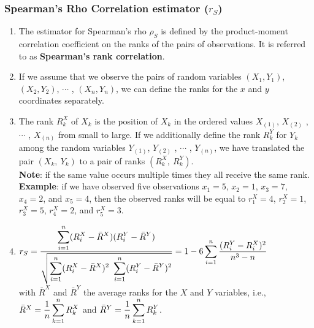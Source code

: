 \subsubsection{Spearman’s Rho Correlation estimator ($r_S$)}

\begin{enumerate}
    \item The estimator for Spearman’s rho $\rho_S$ is defined by the product-moment correlation coefficient on the ranks of the pairs of observations.
    It is referred to as \textbf{Spearman’s rank correlation}.
    \hfill \cite{statistics/book/Statistics-for-Data-Scientists/Maurits-Kaptein}

    \item If we assume that we observe the pairs of random variables $(X_1, Y_1)$, $(X_2, Y_2)$, $\cdots$ , $(X_n , Y_n )$, we can define the ranks for the $x$ and $y$ coordinates separately.
    \hfill \cite{statistics/book/Statistics-for-Data-Scientists/Maurits-Kaptein}

    \item The rank $R^X_k$ of $X_k$ is the position of $X_k$ in the ordered values $X_{(1)}$, $X_{(2)}$ , $\cdots$ , $X_{(n)}$ from small to large.
    If we additionally define the rank $R^Y_k$ for $Y_k$ among the random variables $Y_{(1)}$, $Y_{(2)}$ , $\cdots$ , $Y_{(n)}$, we have translated the pair $(X_k ,\ Y_k )$ to a pair of ranks $(R^X_k ,\ R^Y_k )$.
    \hfill \cite{statistics/book/Statistics-for-Data-Scientists/Maurits-Kaptein}
    \\
    \textbf{Note}: if the same value occurs multiple times they all receive the same rank.
    \hfill \cite{statistics/book/Statistics-for-Data-Scientists/Maurits-Kaptein}
    \\
    \textbf{Example}: if we have observed five observations $x_1 = 5$, $x_2 = 1$, $x_3 = 7$, $x_4 = 2$, and $x_5 = 4$, then the observed ranks will be equal to $r^X_1 = 4$, $r^X_2 = 1$, $r^X_3 = 5$, $r^X_4 = 2$, and $r^X_5 = 3$.
    \hfill \cite{statistics/book/Statistics-for-Data-Scientists/Maurits-Kaptein}

    \item
    $
        r_S
        = \dfrac{\displaystyle\sum^n_{i=1} (R^X_i - \bar{R}^X )(R^Y_i - \bar{R}^Y )}{
            \sqrt{\displaystyle\sum^n_{i=1} (R^X_i - \bar{R}^X )^2\ \displaystyle\sum^n_{i=1} (R^Y_i - \bar{R}^Y )^2}
        }
        = 1 - 6 \displaystyle\sum^n_{i=1} \dfrac{(R^Y_i - R^X_i)^2}{n^3 - n}
    $
    \hfill \cite{statistics/book/Statistics-for-Data-Scientists/Maurits-Kaptein}
    \\[0.3cm]
    with $\bar{R}^X$ and $\bar{R}^Y$ the average ranks for the $X$ and $Y$ variables, i.e., $\bar{R}^X = \dfrac{1}{n} \displaystyle\sum^n_{k=1} R^X_k$ and $\bar{R}^Y = \dfrac{1}{n} \displaystyle\sum^n_{k=1}  R^Y_k$.
    \hfill \cite{statistics/book/Statistics-for-Data-Scientists/Maurits-Kaptein}


\end{enumerate}
